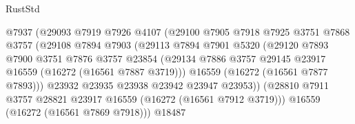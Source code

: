 \begin{lexlean}{RustStd}
\begin{coremodule}
                                    @7937
                                    (@29093
                                      @7919
                                      @7926
                                      @4107
                                      (@29100
                                        @7905
                                        @7918
                                        @7925
                                        @3751
                                        @7868
                                        @3757
                                        (@29108
                                          @7894
                                          @7903
                                          (@29113
                                            @7894
                                            @7901
                                            @5320
                                            (@29120
                                              @7893
                                              @7900
                                              @3751
                                              @7876
                                              @3757
                                              @23854
                                              (@29134
                                                @7886
                                                @3757
                                                @29145
                                                @23917
                                                @16559
                                                (@16272 (@16561 @7887 @3719)))
                                              @16559
                                              (@16272 (@16561 @7877 @7893)))
                                            @23932
                                            @23935
                                            @23938
                                            @23942
                                            @23947
                                            @23953))
                                        (@28810
                                          @7911
                                          @3757
                                          @28821
                                          @23917
                                          @16559
                                          (@16272 (@16561 @7912 @3719)))
                                        @16559
                                        (@16272 (@16561 @7869 @7918)))
                                      @18487

\end{coremodule}
\end{lexlean}
